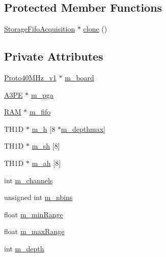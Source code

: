 \subsection*{Protected Member Functions}
\begin{DoxyCompactItemize}
\item 
\hyperlink{classStorageFifoAcquisition_1_1StorageFifoAcquisition}{Storage\+Fifo\+Acquisition} $\ast$ \hyperlink{classStorageFifoAcquisition_aab797010fd3efe7ef2c4a6e6ba4e87c2}{clone} ()
\end{DoxyCompactItemize}
\subsection*{Private Attributes}
\begin{DoxyCompactItemize}
\item 
\hyperlink{classProto40MHz__v1}{Proto40\+M\+Hz\+\_\+v1} $\ast$ \hyperlink{classStorageFifoAcquisition_a86f825b4740c5dcde26933b6debf452f}{m\+\_\+board}
\item 
\hyperlink{classA3PE}{A3\+PE} $\ast$ \hyperlink{classStorageFifoAcquisition_a30a158fb750e33fbec4f2f9ee8cbb68f}{m\+\_\+pga}
\item 
\hyperlink{classRAM}{R\+AM} $\ast$ \hyperlink{classStorageFifoAcquisition_a5405a161dc3983274ccdfdf83687d98d}{m\+\_\+fifo}
\item 
T\+H1D $\ast$ \hyperlink{classStorageFifoAcquisition_a19913cfc87da82b107e49399e3e9b754}{m\+\_\+h} \mbox{[}8 $\ast$\hyperlink{classStorageFifoAcquisition_a2f3ce0569ee9ec4fa78ec66a9cbe6ed7}{m\+\_\+depthmax}\mbox{]}
\item 
T\+H1D $\ast$ \hyperlink{classStorageFifoAcquisition_ace3efa07a424f66783388ad073b31830}{m\+\_\+sh} \mbox{[}8\mbox{]}
\item 
T\+H1D $\ast$ \hyperlink{classStorageFifoAcquisition_ac73454f960b6224d7fe3d104b4b7a51b}{m\+\_\+ah} \mbox{[}8\mbox{]}
\item 
int \hyperlink{classStorageFifoAcquisition_ae3563f586533ac15f48c7f9c8fea3e7f}{m\+\_\+channels}
\item 
unsigned int \hyperlink{classStorageFifoAcquisition_af5f50ba5a71654324d96eddc4d578571}{m\+\_\+nbins}
\item 
float \hyperlink{classStorageFifoAcquisition_ad3cf1ef4173ffe14a0e86b7b8ec8d90b}{m\+\_\+min\+Range}
\item 
float \hyperlink{classStorageFifoAcquisition_adbe54adb957ea13ae6ff9e56b7e398c8}{m\+\_\+max\+Range}
\item 
int \hyperlink{classStorageFifoAcquisition_a6bebf76cce0ccaae599c844a69ebd19d}{m\+\_\+depth}
\end{DoxyCompactItemize}
